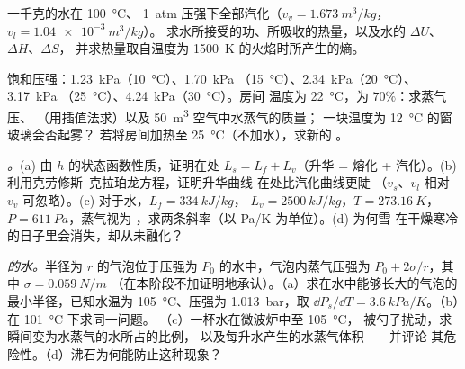 \begin{exercise}[$\star\star$]\label{exo:b1:phase-changes:8}
一千克的水在 \qty{100}{\degreeCelsius}、
\qty{1}{atm} 压强下全部汽化（$v_v = \qty{1.673}{m^3/kg}$，$v_l = \qty{1.04e-3}{m^3/kg}$）。
求水所接受的功、所吸收的热量，以及水的 $\Delta U$、$\Delta H$、$\Delta S$，
并求热量取自温度为
\qty{1500}{K} 的火焰时所产生的熵。
\end{exercise}

\begin{exercise}[$\star\star$]\label{exo:b1:phase-changes:9}
饱和压强：\qty{1.23}{kPa}（\qty{10}{\degreeCelsius}）、\qty{1.70}{kPa}
（\qty{15}{\degreeCelsius}）、\qty{2.34}{kPa}（\qty{20}{\degreeCelsius}）、\qty{3.17}{kPa}
（\qty{25}{\degreeCelsius}）、\qty{4.24}{kPa}（\qty{30}{\degreeCelsius}）。房间
温度为 \qty{22}{\degreeCelsius}，为 $70\%$：求蒸气压、
（用插值法求）以及 \qty{50}{m^3} 空气中水蒸气的质量；
一块温度为 \qty{12}{\degreeCelsius} 的窗玻璃会否起雾？
若将房间加热至 \qty{25}{\degreeCelsius}（不加水），求新的
。
\end{exercise}

\begin{exercise}[$\star\star\star$]\label{exo:b1:phase-changes:10}
\emph{。}(a) 由 $h$ 的状态函数性质，证明在处
$L_s = L_f + L_v$（升华 = 熔化 +
汽化）。(b) 利用克劳修斯–克拉珀龙方程，证明升华曲线
在处比汽化曲线更陡
（$v_s$、$v_l$ 相对 $v_v$ 可忽略）。(c) 对于水，$L_f = \qty{334}{kJ/kg}$，
$L_v = \qty{2500}{kJ/kg}$，$T = \qty{273.16}{K}$，$P = \qty{611}{Pa}$，蒸气视为
，求两条斜率（以 \unit{Pa/K} 为单位）。(d) 为何雪
在干燥寒冷的日子里会消失，却从未融化？
\end{exercise}

\begin{exercise}[$\star\star\star$]\label{exo:b1:phase-changes:11}
\emph{的水。}半径为 $r$ 的气泡位于压强为
$P_0$ 的水中，气泡内蒸气压强为 $P_0 + 2\sigma/r$，其中 $\sigma = \qty{0.059}{N/m}$
（在本阶段不加证明地承认）。（a）求在水中能够长大的气泡的最小半径，已知水温为
\qty{105}{\degreeCelsius}、压强为 \qty{1.013}{bar}，取
$\dd P_s/\dd T = \qty{3.6}{kPa/K}$。（b）在 \qty{101}{\degreeCelsius} 下求同一问题。
（c）一杯水在微波炉中至 \qty{105}{\degreeCelsius}，
被勺子扰动，求瞬间变为水蒸气的水所占的比例，
以及每升水产生的水蒸气体积——并评论
其危险性。（d）沸石为何能防止这种现象？
\end{exercise}

